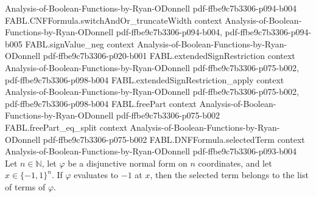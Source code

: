 \begin{theorem}
  {Analysis-of-Boolean-Functions-by-Ryan-ODonnell}
  {pdf-ffbe9c7b3306-p094-b004}
\proofstep
  {FABL.CNFFormula.switchAndOr_truncateWidth}
  {context}
  {Analysis-of-Boolean-Functions-by-Ryan-ODonnell}
  {pdf-ffbe9c7b3306-p094-b004,
    pdf-ffbe9c7b3306-p094-b005}
\proofstep
  {FABL.signValue_neg}
  {context}
  {Analysis-of-Boolean-Functions-by-Ryan-ODonnell}
  {pdf-ffbe9c7b3306-p020-b001}
\proofstep
  {FABL.extendedSignRestriction}
  {context}
  {Analysis-of-Boolean-Functions-by-Ryan-ODonnell}
  {pdf-ffbe9c7b3306-p075-b002,
    pdf-ffbe9c7b3306-p098-b004}
\proofstep
  {FABL.extendedSignRestriction_apply}
  {context}
  {Analysis-of-Boolean-Functions-by-Ryan-ODonnell}
  {pdf-ffbe9c7b3306-p075-b002,
    pdf-ffbe9c7b3306-p098-b004}
\proofstep
  {FABL.freePart}
  {context}
  {Analysis-of-Boolean-Functions-by-Ryan-ODonnell}
  {pdf-ffbe9c7b3306-p075-b002}
\proofstep
  {FABL.freePart_eq_split}
  {context}
  {Analysis-of-Boolean-Functions-by-Ryan-ODonnell}
  {pdf-ffbe9c7b3306-p075-b002}
\proofstep
  {FABL.DNFFormula.selectedTerm}
  {context}
  {Analysis-of-Boolean-Functions-by-Ryan-ODonnell}
  {pdf-ffbe9c7b3306-p093-b004}
Let $n\in\mathbb N$, let $\varphi$ be a disjunctive normal form on $n$ coordinates, and
let $x\in\{-1,1\}^n$. If $\varphi$ evaluates to $-1$ at $x$, then the selected term
belongs to the list of terms of $\varphi$.
\end{theorem}

